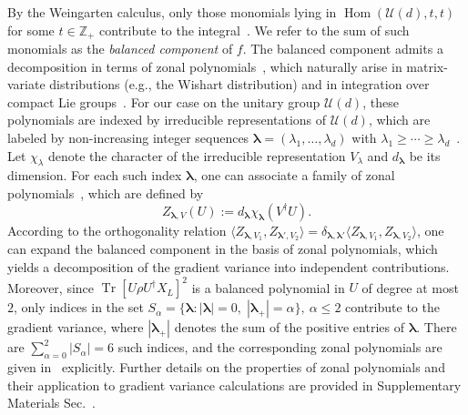 \documentclass[%
 superscriptaddress,
 aps,prl,
 reprint,
 twocolumn,
 amsmath,amssymb,showpacs,
 bibnotes,
]{revtex4-2}
\newcommand{\RomanNumeralCaps}[1]
    {\MakeUppercase{\romannumeral #1}}
\begin{document}
By the Weingarten calculus, only those monomials lying in $\operatorname{Hom}(\mathcal{U}(d), t, t)$ for some $t \in \mathbb{Z}_+$ contribute to the integral~\cite{fukuda2019rtni}. We refer to the sum of such monomials as the \emph{balanced component} of $f$.
The balanced component admits a decomposition in terms of zonal polynomials~\cite{james1961zonal,james1964distributions,constantine1963some}, which naturally arise in matrix-variate distributions (e.g., the Wishart distribution) and in integration over compact Lie groups~\cite{constantine1963some}. For our case on the unitary group $\mathcal{U}(d)$, these polynomials are indexed by irreducible representations of $\mathcal{U}(d)$, which are labeled by non-increasing integer sequences ${\boldsymbol\lambda} = (\lambda_1,\dots,\lambda_d)$ with $\lambda_1 \ge \cdots \ge \lambda_d$~\cite{bump2004lie}. Let $\chi_\lambda$ denote the character of the irreducible representation $V_\lambda$ and $d_{\boldsymbol{\lambda}}$ be its dimension. For each such index ${\boldsymbol\lambda}$, one can associate a family of zonal polynomials~\cite{roy2009unitary}, which are defined by
\begin{equation}
    Z_{\boldsymbol{\lambda}, V}(U) := d_{\boldsymbol{\lambda}}\chi_{\boldsymbol{\lambda}}(V^\dagger U).
\end{equation}
According to the orthogonality relation $\langle Z_{{\boldsymbol\lambda}, V_1}, Z_{{\boldsymbol\lambda}', V_2} \rangle = \delta_{{\boldsymbol\lambda},{\boldsymbol\lambda}'}\langle Z_{{\boldsymbol\lambda}, V_1}, Z_{{\boldsymbol\lambda}, V_2} \rangle$, one can expand the balanced component in the basis of zonal polynomials, which yields a decomposition of the gradient variance into independent contributions.
Moreover, since $\operatorname{Tr}[U \rho U^\dagger X_L]^2$ is a balanced polynomial in $U$ of degree at most $2$, only indices in the set $S_\alpha = \{{\boldsymbol\lambda} : |{\boldsymbol\lambda}| = 0,\; |{\boldsymbol\lambda}_+| = \alpha\},\ \alpha\leq 2$ contribute to the gradient variance, where $|{\boldsymbol\lambda}_+|$ denotes the sum of the positive entries of ${\boldsymbol\lambda}$. There are $\sum_{\alpha=0}^2 |S_\alpha| = 6$ such indices, and the corresponding zonal polynomials are given in~\cite {roy2009unitary} explicitly.
Further details on the properties of zonal polynomials and their application to gradient variance calculations are provided in Supplementary Materials Sec.~\RomanNumeralCaps{3}.
\end{document}
